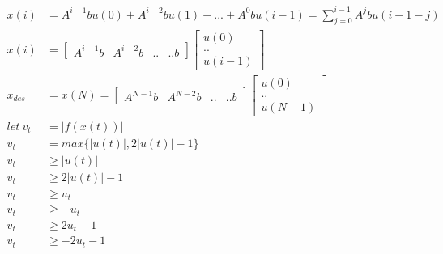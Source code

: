 \documentclass[12pt,letter]{article}
\begin{document}
\begin{enumerate}
\begin{align*}
    x(i)&=A^{i-1}bu(0) + A^{i-2}bu(1) + ... + A^0 bu(i-1)=\sum_{j=0}^{i-1} A^{j}bu(i-1-j)\\
    x(i)&=
    \begin{bmatrix}
      A^{i-1}b & A^{i-2}b & .. & .. b
    \end{bmatrix}
    \begin{bmatrix}
      u(0) \\ .. \\ u(i-1)
    \end{bmatrix}\\
    x_{des} & = x(N) = \begin{bmatrix}
      A^{N-1}b & A^{N-2}b & .. & .. b
    \end{bmatrix}
    \begin{bmatrix}
      u(0) \\ .. \\ u(N-1)
    \end{bmatrix}\\
    let\ v_t & = |f(x(t))|\\
    v_t & = max\{ |u(t)|, 2|u(t)|-1 \}\\
    v_t &\geq |u(t)|\\
    v_t &\geq 2|u(t)|-1\\
    v_t &\geq u_t\\
    v_t &\geq -u_t\\
    v_t &\geq 2u_t-1\\
    v_t &\geq -2u_t-1
  \end{align*}
  

\end{enumerate}
\end{document}
